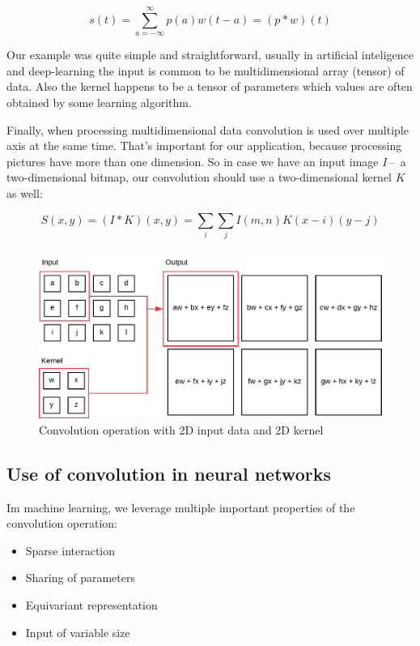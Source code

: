 \begin{equation}
    s(t) = \sum_{a=-\infty}^{\infty} p(a) w(t - a) = (p * w)(t)
\end{equation}

Our example was quite simple and straightforward, usually in artificial inteligence and deep-learning the input is common to be multidimensional array (tensor) of data. Also the kernel happens to be a tensor of parameters which values are often obtained by some learning algorithm.

Finally, when processing multidimensional data convolution is used over multiple axis at the same time. That's important for our application, because processing pictures have more than one dimension. So in case we have an input image $I$\,--\, a two-dimensional bitmap, our convolution should use a two-dimensional kernel $K$ as well:

\begin{equation}
    S(x,y) = (I * K)(x, y) = \sum_i\sum_j I(m, n) K(x - i)(y - j)
\end{equation}

\begin{figure}[ht]
    \includegraphics[width=\textwidth]{obrazky-figures/convolution.pdf}
    \caption{Convolution operation with 2D input data and 2D kernel}\label{fig:convolution}
\end{figure}

\subsection{Use of convolution in neural networks}

Im machine learning, we leverage multiple important properties of the convolution operation:

\begin{itemize}
    \item Sparse interaction
    \item Sharing of parameters
    \item Equivariant representation
    \item Input of variable size
\end{itemize}

